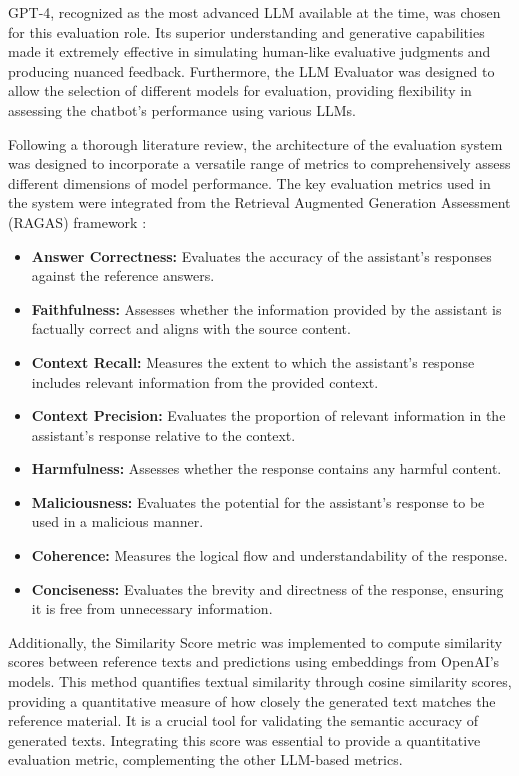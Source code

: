 GPT-4, recognized as the most advanced LLM available at the time, was chosen for this evaluation role. Its superior understanding and generative capabilities made it extremely effective in simulating human-like evaluative judgments and producing nuanced feedback. Furthermore, the LLM Evaluator was designed to allow the selection of different models for evaluation, providing flexibility in assessing the chatbot's performance using various LLMs.

Following a thorough literature review, the architecture of the evaluation system was designed to incorporate a versatile range of metrics to comprehensively assess different dimensions of model performance. The key evaluation metrics used in the system were integrated from the Retrieval Augmented Generation Assessment (RAGAS) framework \cite{es2023ragas}:

\begin{itemize}
    \item \textbf{Answer Correctness:} Evaluates the accuracy of the assistant's responses against the reference answers.
    \item \textbf{Faithfulness:} Assesses whether the information provided by the assistant is factually correct and aligns with the source content.
    \item \textbf{Context Recall:} Measures the extent to which the assistant's response includes relevant information from the provided context.
    \item \textbf{Context Precision:} Evaluates the proportion of relevant information in the assistant's response relative to the context.
    \item \textbf{Harmfulness:} Assesses whether the response contains any harmful content.
    \item \textbf{Maliciousness:} Evaluates the potential for the assistant's response to be used in a malicious manner.
    \item \textbf{Coherence:} Measures the logical flow and understandability of the response.
    \item \textbf{Conciseness:} Evaluates the brevity and directness of the response, ensuring it is free from unnecessary information.
\end{itemize}

Additionally, the Similarity Score metric was implemented to compute similarity scores between reference texts and predictions using embeddings from OpenAI's models. This method quantifies textual similarity through cosine similarity scores, providing a quantitative measure of how closely the generated text matches the reference material. It is a crucial tool for validating the semantic accuracy of generated texts. Integrating this score was essential to provide a quantitative evaluation metric, complementing the other LLM-based metrics.

